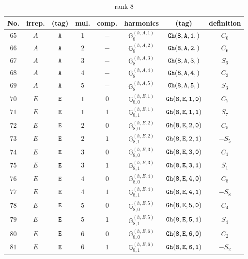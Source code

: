 \documentclass[fleqn,8pt]{jsarticle}
\begin{document}
\begin{table}[ht!]
\begin{center}
\caption{rank 8}
\renewcommand{\arraystretch}{1.3}
\begin{tabular}{cccccccc} \hline \hline
No. & irrep. & (tag) & mul. & comp. & harmonics & (tag) & definition \\ \hline
$ 65 $ & $ A $ & $ {\tt A} $ & $ 1 $ & $ - $ & $ \mathbb{G}_{8}^{(h,A,1)} $ & $ {\tt Gh(8,A,1,)} $ & $ C_{0} $ \\
$ 66 $ & $ A $ & $ {\tt A} $ & $ 2 $ & $ - $ & $ \mathbb{G}_{8}^{(h,A,2)} $ & $ {\tt Gh(8,A,2,)} $ & $ C_{6} $ \\
$ 67 $ & $ A $ & $ {\tt A} $ & $ 3 $ & $ - $ & $ \mathbb{G}_{8}^{(h,A,3)} $ & $ {\tt Gh(8,A,3,)} $ & $ S_{6} $ \\
$ 68 $ & $ A $ & $ {\tt A} $ & $ 4 $ & $ - $ & $ \mathbb{G}_{8}^{(h,A,4)} $ & $ {\tt Gh(8,A,4,)} $ & $ C_{3} $ \\
$ 69 $ & $ A $ & $ {\tt A} $ & $ 5 $ & $ - $ & $ \mathbb{G}_{8}^{(h,A,5)} $ & $ {\tt Gh(8,A,5,)} $ & $ S_{3} $ \\
$ 70 $ & $ E $ & $ {\tt E} $ & $ 1 $ & $ 0 $ & $ \mathbb{G}_{8,0}^{(h,E,1)} $ & $ {\tt Gh(8,E,1,0)} $ & $ C_{7} $ \\
$ 71 $ & $ E $ & $ {\tt E} $ & $ 1 $ & $ 1 $ & $ \mathbb{G}_{8,1}^{(h,E,1)} $ & $ {\tt Gh(8,E,1,1)} $ & $ S_{7} $ \\
$ 72 $ & $ E $ & $ {\tt E} $ & $ 2 $ & $ 0 $ & $ \mathbb{G}_{8,0}^{(h,E,2)} $ & $ {\tt Gh(8,E,2,0)} $ & $ C_{5} $ \\
$ 73 $ & $ E $ & $ {\tt E} $ & $ 2 $ & $ 1 $ & $ \mathbb{G}_{8,1}^{(h,E,2)} $ & $ {\tt Gh(8,E,2,1)} $ & $ - S_{5} $ \\
$ 74 $ & $ E $ & $ {\tt E} $ & $ 3 $ & $ 0 $ & $ \mathbb{G}_{8,0}^{(h,E,3)} $ & $ {\tt Gh(8,E,3,0)} $ & $ C_{1} $ \\
$ 75 $ & $ E $ & $ {\tt E} $ & $ 3 $ & $ 1 $ & $ \mathbb{G}_{8,1}^{(h,E,3)} $ & $ {\tt Gh(8,E,3,1)} $ & $ S_{1} $ \\
$ 76 $ & $ E $ & $ {\tt E} $ & $ 4 $ & $ 0 $ & $ \mathbb{G}_{8,0}^{(h,E,4)} $ & $ {\tt Gh(8,E,4,0)} $ & $ C_{8} $ \\
$ 77 $ & $ E $ & $ {\tt E} $ & $ 4 $ & $ 1 $ & $ \mathbb{G}_{8,1}^{(h,E,4)} $ & $ {\tt Gh(8,E,4,1)} $ & $ - S_{8} $ \\
$ 78 $ & $ E $ & $ {\tt E} $ & $ 5 $ & $ 0 $ & $ \mathbb{G}_{8,0}^{(h,E,5)} $ & $ {\tt Gh(8,E,5,0)} $ & $ C_{4} $ \\
$ 79 $ & $ E $ & $ {\tt E} $ & $ 5 $ & $ 1 $ & $ \mathbb{G}_{8,1}^{(h,E,5)} $ & $ {\tt Gh(8,E,5,1)} $ & $ S_{4} $ \\
$ 80 $ & $ E $ & $ {\tt E} $ & $ 6 $ & $ 0 $ & $ \mathbb{G}_{8,0}^{(h,E,6)} $ & $ {\tt Gh(8,E,6,0)} $ & $ C_{2} $ \\
$ 81 $ & $ E $ & $ {\tt E} $ & $ 6 $ & $ 1 $ & $ \mathbb{G}_{8,1}^{(h,E,6)} $ & $ {\tt Gh(8,E,6,1)} $ & $ - S_{2} $ \\
 \hline \hline
\end{tabular}
\end{center}
\end{table}
\end{document}
